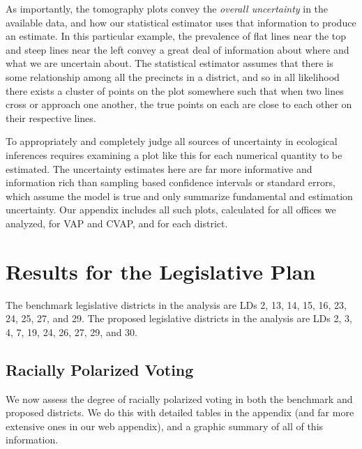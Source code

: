 \documentclass[12pt]{article}
\begin{document}
As importantly, the tomography plots convey the \emph{overall
  uncertainty} in the available data, and how our statistical
estimator uses that information to produce an estimate.  In this
particular example, the prevalence of flat lines near the top and
steep lines near the left convey a great deal of information about
where and what we are uncertain about.  The statistical estimator
assumes that there is some relationship among all the precincts in a
district, and so in all likelihood there exists a cluster of points on
the plot somewhere such that when two lines cross or approach one
another, the true points on each are close to each other on their
respective lines.  

To appropriately and completely judge all sources of uncertainty in
ecological inferences requires examining a plot like this for each
numerical quantity to be estimated.  The uncertainty estimates here
are far more informative and information rich than sampling based
confidence intervals or standard errors, which assume the model is
true and only summarize fundamental and estimation uncertainty.  Our
appendix includes all such plots, calculated for all offices we
analyzed, for VAP and CVAP, and for each district.

\section{Results for the Legislative Plan}\label{s:res}

The benchmark legislative districts in the analysis are LDs 2, 13, 14,
15, 16, 23, 24, 25, 27, and 29. The proposed legislative districts in
the analysis are LDs 2, 3, 4, 7, 19, 24, 26, 27, 29, and 30.

\subsection{Racially Polarized Voting}

We now assess the degree of racially polarized voting in both the
benchmark and proposed districts.  We do this with detailed tables in
the appendix (and far more extensive ones in our web appendix), and a
graphic summary of all of this information.

\end{document}
